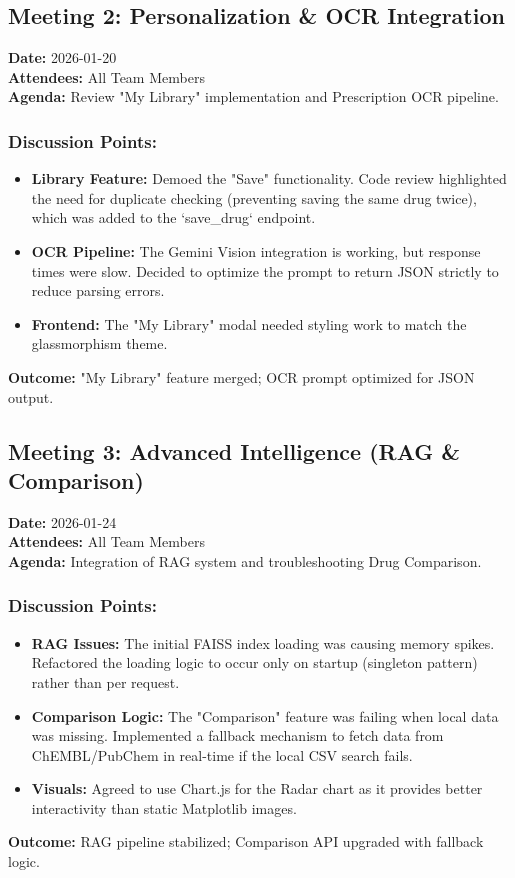 \documentclass[a4paper,12pt]{article}
\begin{document}
\hrulefill

\subsection*{Meeting 2: Personalization & OCR Integration}
\textbf{Date:} 2026-01-20 \\
\textbf{Attendees:} All Team Members \\
\textbf{Agenda:} Review "My Library" implementation and Prescription OCR pipeline.

\subsubsection*{Discussion Points:}
\begin{itemize}
    \item \textbf{Library Feature:} Demoed the "Save" functionality. Code review highlighted the need for duplicate checking (preventing saving the same drug twice), which was added to the `save_drug` endpoint.
    \item \textbf{OCR Pipeline:} The Gemini Vision integration is working, but response times were slow. Decided to optimize the prompt to return JSON strictly to reduce parsing errors.
    \item \textbf{Frontend:} The "My Library" modal needed styling work to match the glassmorphism theme.
\end{itemize}
\textbf{Outcome:} "My Library" feature merged; OCR prompt optimized for JSON output.

\hrulefill

\subsection*{Meeting 3: Advanced Intelligence (RAG & Comparison)}
\textbf{Date:} 2026-01-24 \\
\textbf{Attendees:} All Team Members \\
\textbf{Agenda:} Integration of RAG system and troubleshooting Drug Comparison.

\subsubsection*{Discussion Points:}
\begin{itemize}
    \item \textbf{RAG Issues:} The initial FAISS index loading was causing memory spikes. Refactored the loading logic to occur only on startup (singleton pattern) rather than per request.
    \item \textbf{Comparison Logic:} The "Comparison" feature was failing when local data was missing. Implemented a fallback mechanism to fetch data from ChEMBL/PubChem in real-time if the local CSV search fails.
    \item \textbf{Visuals:} Agreed to use Chart.js for the Radar chart as it provides better interactivity than static Matplotlib images.
\end{itemize}
\textbf{Outcome:} RAG pipeline stabilized; Comparison API upgraded with fallback logic.
\end{document}
